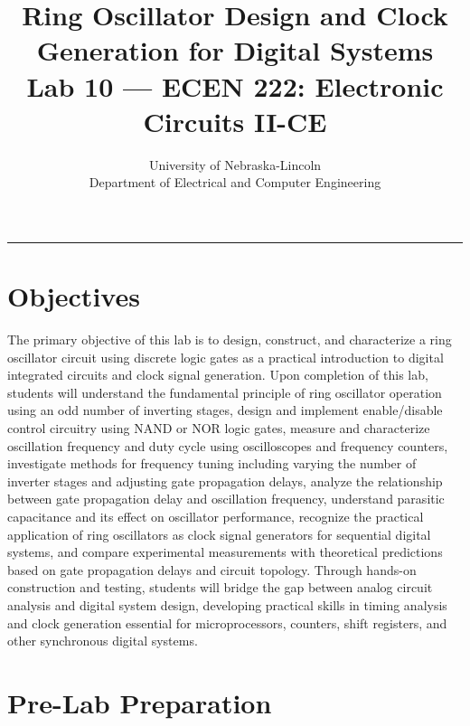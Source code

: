 \documentclass[10pt]{article}
\title{\textbf{\Huge Ring Oscillator Design and Clock Generation for Digital Systems}\\
\large Lab 10 — ECEN 222: Electronic Circuits II-CE}
\author{
\large University of Nebraska-Lincoln \\
\large Department of Electrical and Computer Engineering
}
\date{} %
\begin{document}
\thispagestyle{fancy}
\maketitle
\rule{\textwidth}{0.5pt}

\section{Objectives}

The primary objective of this lab is to design, construct, and characterize a ring oscillator circuit using discrete logic gates as a practical introduction to digital integrated circuits and clock signal generation.  Upon completion of this lab, students will understand the fundamental principle of ring oscillator operation using an odd number of inverting stages, design and implement enable/disable control circuitry using NAND or NOR logic gates, measure and characterize oscillation frequency and duty cycle using oscilloscopes and frequency counters, investigate methods for frequency tuning including varying the number of inverter stages and adjusting gate propagation delays, analyze the relationship between gate propagation delay and oscillation frequency, understand parasitic capacitance and its effect on oscillator performance, recognize the practical application of ring oscillators as clock signal generators for sequential digital systems, and compare experimental measurements with theoretical predictions based on gate propagation delays and circuit topology.  Through hands-on construction and testing, students will bridge the gap between analog circuit analysis and digital system design, developing practical skills in timing analysis and clock generation essential for microprocessors, counters, shift registers, and other synchronous digital systems.

\section{Pre-Lab Preparation}
\end{document}
